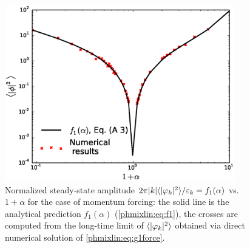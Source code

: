 \begin{figure}
\begin{center}
\includegraphics[width=10cm]{figs/phmixlin/phi2_g1.eps}
\caption{Normalized steady-state amplitude $2\pi|k|\langle|\varphi_k|^2\rangle/\varepsilon_k=f_1(\alpha)$ 
vs.\ $1+\alpha$ for the case of momentum forcing: 
the solid line is the analytical prediction $f_1(\alpha)$ (\eqref{phmixlin:eq:f1}), 
the crosses are computed from 
the long-time limit of $\langle|\varphi_k|^2\rangle$ obtained via direct numerical 
solution of \eqref{phmixlin:eq:g1force}.}
\label{phmixlin:fig:f1}
\end{center}
\end{figure}

